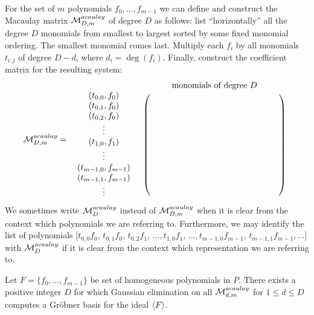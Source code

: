 For the set of $m$ polynomials $f_0,\dots, f_{m-1}$ we can define and construct the Macaulay matrix $\mathcal{M}^{acaulay}_{D,m}$ of degree $D$ as follows: list ``horizontally'' all the degree $D$ monomials from smallest to largest sorted by some fixed monomial ordering. The smallest monomial comes last. Multiply each $f_i$ by all monomials $t_{i,j}$ of degree $D-d_i$ where $d_i = \deg(f_i)$. Finally, construct the coefficient matrix for the resulting system:
\begin{align*}
\Mac{D,m} = \begin{array}{cc}
 & \textnormal{monomials of degree } D\\
\begin{array}{c}(t_{0,0},f_0)\\
(t_{0,1},f_0)\\
(t_{0,2},f_0)\\
\vdots\\
(t_{1,0},f_1)\\
\vdots\\
(t_{m-1,0},f_{m-1})\\
(t_{m-1,1},f_{m-1})\\
\vdots\\
\end{array} &
\left(\begin{array}{c} \\
\hspace{5cm}\\	
\\	
\\	
\\	
\\	
\\	
\\
\\
\\
\end{array}\right)
\end{array}
\end{align*}
We sometimes write $\mathcal{M}^{acaulay}_{D}$ instead of $\mathcal{M}^{acaulay}_{D,m}$ when it is clear from the context which polynomials we are referring to. Furthermore, we may identify the list of polynomials
$[t_{0,0}f_0$, $t_{0,1}f_0$, $t_{0,2}f_1$, $\dots,t_{1,0}f_1$, $\dots,t_{m-1,0}f_{m-1}$, $t_ {m-1,1}f_{m-1},\dots]$ with $\mathcal{M}^{acaulay}_{D}$ if it is clear from the context which representation we are referring to.

\begin{theorem}
\label{theorem:lazard}
Let $F=\{f_0,\dots,f_{m-1}\}$ be set of homogeneous polynomials in $P$. There exists a positive integer $D$ for which Gaussian elimination on all $\mathcal{M}^{acaulay}_{d,m}$ for $1 \leq d \leq D$ computes a Gröbner basis for the ideal $\langle {F} \rangle$.
\end{theorem}

